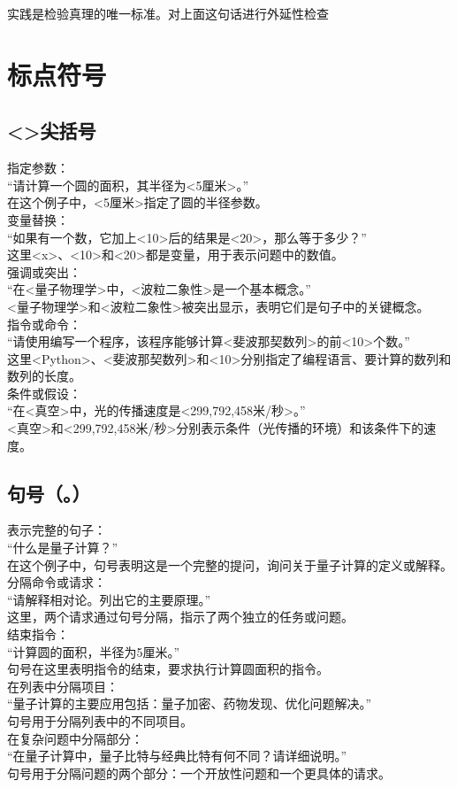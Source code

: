 \documentclass[12pt]{book}
\begin{document}
实践是检验真理的唯一标准。对上面这句话进行外延性检查

\chapter{标点符号}
\section{<>尖括号}
指定参数：\\
“请计算一个圆的面积，其半径为<5厘米>。”\\
在这个例子中，<5厘米>指定了圆的半径参数。\\
变量替换：\\
“如果有一个数，它加上<10>后的结果是<20>，那么等于多少？”\\
这里<x>、<10>和<20>都是变量，用于表示问题中的数值。\\
强调或突出：\\
“在<量子物理学>中，<波粒二象性>是一个基本概念。”\\
<量子物理学>和<波粒二象性>被突出显示，表明它们是句子中的关键概念。\\
指令或命令：\\
“请使用编写一个程序，该程序能够计算<斐波那契数列>的前<10>个数。”\\
这里<Python>、<斐波那契数列>和<10>分别指定了编程语言、要计算的数列和数列的长度。\\
条件或假设：\\
“在<真空>中，光的传播速度是<299,792,458米/秒>。”\\
<真空>和<299,792,458米/秒>分别表示条件（光传播的环境）和该条件下的速度。\\

\section{句号（。）}
表示完整的句子：\\
“什么是量子计算？”\\
在这个例子中，句号表明这是一个完整的提问，询问关于量子计算的定义或解释。\\
分隔命令或请求：\\
“请解释相对论。列出它的主要原理。”\\
这里，两个请求通过句号分隔，指示了两个独立的任务或问题。\\
结束指令：\\
“计算圆的面积，半径为5厘米。”\\
句号在这里表明指令的结束，要求执行计算圆面积的指令。\\
在列表中分隔项目：\\
“量子计算的主要应用包括：量子加密、药物发现、优化问题解决。”\\
句号用于分隔列表中的不同项目。\\
在复杂问题中分隔部分：\\
“在量子计算中，量子比特与经典比特有何不同？请详细说明。”\\
句号用于分隔问题的两个部分：一个开放性问题和一个更具体的请求。\\
\end{document}
